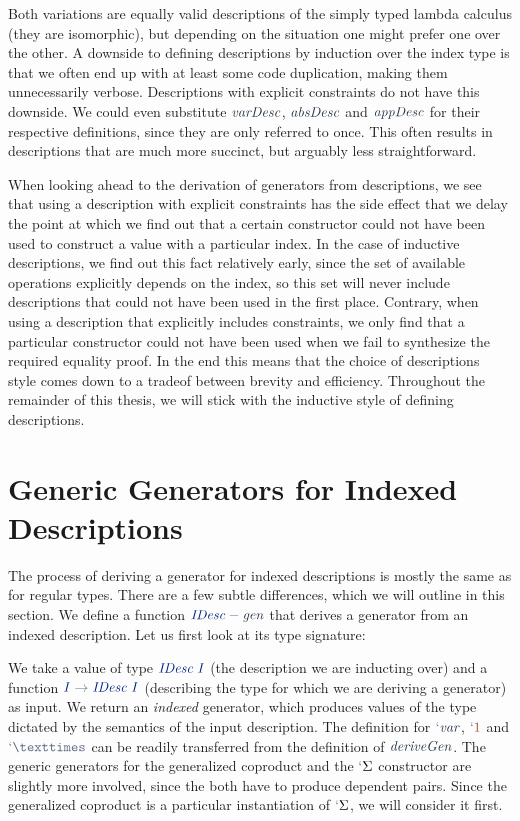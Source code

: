\documentclass[a4paper,msc,twosized=semi]{uustthesis}
\newcommand{\includeagda}[2]{\vspace*{-0.35cm}\begin{center}\ExecuteMetaData[../src/chap0#1/latex/code.tex]{#2}\end{center}\vspace*{-0.35cm}}
\newcommand*{\mathcolor}{}
\def\mathcolor#1#{\mathcoloraux{#1}}
\newcommand*{\mathcoloraux}[3]{%
  \protect\leavevmode
  \begingroup
    \color#1{#2}#3%
  \endgroup
}
\newcommand{\HSNumeral}[1]{\mathcolor{hsred3}{#1}}
\newcommand{\HSSpecial}[1]{\mathcolor{hsblue4}{#1}}
\newcommand{\HSSym}[1]{\mathcolor{hsblue4}{#1}}
\newcommand{\HSCon}[1]{\mathcolor{hsblue3}{\mathit{#1}}}
\newcommand{\HSVar}[1]{\mathcolor{hsblue5}{\mathit{#1}}}
\begin{document}
  Both variations are equally valid descriptions of the simply typed lambda calculus (they are isomorphic), but depending on the situation one might prefer one over the other. A downside to defining descriptions by induction over the index type is that we often end up with at least some code duplication, making them unnecessarily verbose. Descriptions with explicit constraints do not have this downside. We could even substitute \ensuremath{\HSVar{varDesc}}, \ensuremath{\HSVar{absDesc}} and \ensuremath{\HSVar{appDesc}} for their respective definitions, since they are only referred to once. This often results in descriptions that are much more succinct, but arguably less straightforward. 

  When looking ahead to the derivation of generators from descriptions, we see that using a description with explicit constraints has the side effect that we delay the point at which we find out that a certain constructor could not have been used to construct a value with a particular index. In the case of inductive descriptions, we find out this fact relatively early, since the set of available operations explicitly depends on the index, so this set will never include descriptions that could not have been used in the first place. Contrary, when using a description that explicitly includes constraints, we only find that a particular constructor could not have been used when we fail to synthesize the required equality proof. In the end this means that the choice of descriptions style comes down to a tradeof between brevity and efficiency. Throughout the remainder of this thesis, we will stick with the inductive style of defining descriptions. 

\section{Generic Generators for Indexed Descriptions}

  The process of deriving a generator for indexed descriptions is mostly the same as for regular types. There are a few subtle differences, which we will outline in this section. We define a function \ensuremath{\HSCon{IDesc}\HSSym{-}\HSVar{gen}} that derives a generator from an indexed description. Let us first look at its type signature: 

\includeagda{7}{idescgen}

  We take a value of type \ensuremath{\HSCon{IDesc}\;\HSCon{I}} (the description we are inducting over) and a function \ensuremath{\HSCon{I}\HSSym{\to} \HSCon{IDesc}\;\HSCon{I}} (describing the type for which we are deriving a generator) as input. We return an \emph{indexed} generator, which produces values of the type dictated by the semantics of the input description. The definition for \ensuremath{\HSSpecial{`}\HSVar{var}}, \ensuremath{\HSSpecial{`}\HSNumeral{1}} and \ensuremath{\HSSpecial{`}\HSSym{×}} can be readily transferred from the definition of \ensuremath{\HSVar{deriveGen}}. The generic generators for the generalized coproduct and the \ensuremath{\HSSpecial{`}\Sigma } constructor are slightly more involved, since the both have to produce dependent pairs. Since the generalized coproduct is a particular instantiation of \ensuremath{\HSSpecial{`}\Sigma }, we will consider it first. 
\end{document}
